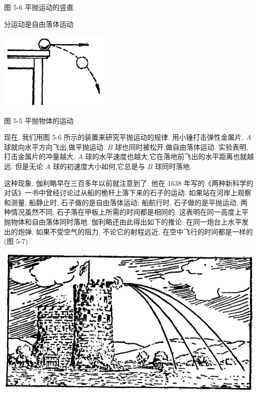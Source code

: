 \documentclass[10pt]{article}
\begin{document}
图 5-6 平抛运动的竖直

分运动是自由落体运动

\begin{center}
\includegraphics[max width=0.4\textwidth]{images/01912d55-147c-70aa-b0e0-1782a122f948_133_877117.jpg}
\end{center}

图 5-5 平抛物体的运动

现在, 我们用图 5-6 所示的装置来研究平抛运动的规律. 用小锤打击弹性金属片, \(A\) 球就向水平方向飞出,做平抛运动. \(B\) 球也同时被松开,做自由落体运动. 实验表明,打击金属片的冲量越大, \(A\) 球的水平速度也越大,它在落地前飞出的水平距离也就越远. 但是无论 \(A\) 球的初速度大小如何,它总是与 \(B\) 球同时落地.

这种现象, 伽利略早在三百多年以前就注意到了. 他在 1638 年写的《两种新科学的对话》一书中曾经讨论过从船的桅杆上落下来的石子的运动. 如果站在河岸上观察和测量, 船静止时, 石子做的是自由落体运动; 船航行时, 石子做的是平抛运动, 两种情况虽然不同, 石子落在甲板上所需的时间都是相同的. 这表明在同一高度上平抛物体和自由落体同时落地. 伽利略还由此得出如下的推论: 在同一炮台上水平发出的炮弹, 如果不受空气的阻力, 不论它的射程远近, 在空中飞行的时间都是一样的(图 5-7).

\begin{center}
\includegraphics[max width=1.0\textwidth]{images/01912d55-147c-70aa-b0e0-1782a122f948_134_376031.jpg}
\end{center}
\end{document}
